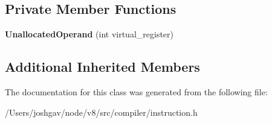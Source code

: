 \subsection*{Private Member Functions}
\begin{DoxyCompactItemize}
\item 
{\bfseries Unallocated\+Operand} (int virtual\+\_\+register)\hypertarget{classv8_1_1internal_1_1compiler_1_1_unallocated_operand_a28dd33e32b1184dfdb3e3ecccb039d98}{}\label{classv8_1_1internal_1_1compiler_1_1_unallocated_operand_a28dd33e32b1184dfdb3e3ecccb039d98}

\end{DoxyCompactItemize}
\subsection*{Additional Inherited Members}


The documentation for this class was generated from the following file\+:\begin{DoxyCompactItemize}
\item 
/\+Users/joshgav/node/v8/src/compiler/instruction.\+h\end{DoxyCompactItemize}
